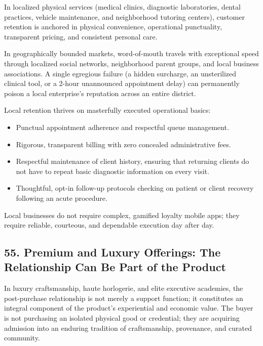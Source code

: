 In localized physical services (medical clinics, diagnostic laboratories, dental practices, vehicle maintenance, and neighborhood tutoring centers), customer retention is anchored in physical convenience, operational punctuality, transparent pricing, and consistent personal care.

In geographically bounded markets, word-of-mouth travels with exceptional speed through localized social networks, neighborhood parent groups, and local business associations. A single egregious failure (a hidden surcharge, an unsterilized clinical tool, or a 2-hour unannounced appointment delay) can permanently poison a local enterprise's reputation across an entire district.

Local retention thrives on masterfully executed operational basics:
\begin{itemize}[leftmargin=*]
\item Punctual appointment adherence and respectful queue management.
\item Rigorous, transparent billing with zero concealed administrative fees.
\item Respectful maintenance of client history, ensuring that returning clients do not have to repeat basic diagnostic information on every visit.
\item Thoughtful, opt-in follow-up protocols checking on patient or client recovery following an acute procedure.
\end{itemize}

Local businesses do not require complex, gamified loyalty mobile apps; they require reliable, courteous, and dependable execution day after day.

\subsection*{55. Premium and Luxury Offerings: The Relationship Can Be Part of the Product}

In luxury craftsmanship, haute horlogerie, and elite executive academies, the post-purchase relationship is not merely a support function; it constitutes an integral component of the product's experiential and economic value. The buyer is not purchasing an isolated physical good or credential; they are acquiring admission into an enduring tradition of craftsmanship, provenance, and curated community.

